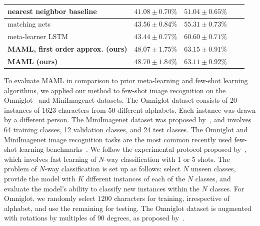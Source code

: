 \documentclass{article}
\begin{document}
\begin{table}[t]
\begin{center}
{\begin{tabular}{|l|c|c|c|c|}
\hline
nearest neighbor baseline & $41.08 \pm 0.70\%$ & $51.04 \pm 0.65\%$ \\
\hline
matching nets~\cite{matchingnets} & $43.56 \pm 0.84\%$ & $55.31 \pm 0.73\%$ \\
\hline
meta-learner LSTM~\cite{hugo} & $43.44 \pm 0.77\%$ & $60.60 \pm 0.71\%$  \\
\hline
\textbf{MAML, first order approx. (ours)}  & $\mathbf{48.07 \pm 1.75\%}$ & $\mathbf{63.15 \pm 0.91\%}$  \\
\hline
\textbf{MAML (ours)}  & $\mathbf{48.70 \pm 1.84\%}$ & $\mathbf{63.11 \pm 0.92\%}$  \\
\hline
\end{tabular}
}
\end{center}
\vspace{-0.35cm}
\end{table}

To evaluate MAML in comparison to prior meta-learning and few-shot learning algorithms, we applied our method to few-shot image recognition on the Omniglot~\cite{omniglot} and MiniImagenet datasets. The Omniglot dataset consists of 20 instances of 1623 characters from 50 different alphabets. Each instance was drawn by a different person. The MiniImagenet dataset was proposed by~\citet{hugo}, and involves 64 training classes, 12 validation classes, and 24 test classes. The Omniglot and MiniImagenet image recognition tasks are the most common recently used few-shot learning benchmarks~\cite{matchingnets,mann,hugo}. We follow the experimental protocol proposed by~\citet{matchingnets}, which involves fast learning of $N$-way classification with 1 or 5 shots. The problem of $N$-way classification is set up as follows: select $N$ unseen classes, provide the model with $K$ different instances of each of the $N$ classes, and evaluate the model's ability to classify new instances within the $N$ classes. For Omniglot, we randomly select $1200$ characters for training, irrespective of alphabet, and use the remaining for testing. The Omniglot dataset is augmented with rotations by multiples of $90$ degrees, as proposed by~\citet{mann}.
\end{document}
